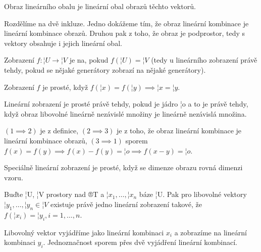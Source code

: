 \documentclass[12pt]{article}					%
\begin{document}
    \begin{tvrzeni}
        Obraz lineárního obalu je lineární obal obrazů těchto vektorů.
        \begin{dukazin}
            Rozdělíme na dvě inkluze. Jedno dokážeme tím, že obraz lineární kombinace je lineární kombinace obrazů. Druhou pak z toho, že obraz je podprostor, tedy s vektory obsahuje i jejich lineární obal.
        \end{dukazin}
    \end{tvrzeni}

    \begin{definice}
        Zobrazení $f: ¦U \rightarrow ¦V$ je na, pokud $f(¦U) = ¦V$ (tedy u lineárního zobrazení právě tehdy, pokud se nějaké generátory zobrazí na nějaké generátory).

        Zobrazení $f$ je prosté, když $f(¦x) = f(¦y) \implies ¦x = ¦y$.
    \end{definice}

    \begin{veta}
        Lineární zobrazení je prosté právě tehdy, pokud je jádro ¦o a to je právě tehdy, když obraz libovolné lineárně nezávislé množiny je lineárně nezávislá množina.

        \begin{dukazin}
            $(1 \implies 2)$ je z definice, $(2 \implies 3)$ je z toho, že obraz lineární kombinace je lineární kombinace obrazů, $(3 \implies 1)$ sporem $f(x) = f(y) \implies f(x) - f(y) = ¦o \implies f(x-y) = ¦o$.
        \end{dukazin}
    \end{veta}

    \begin{dusledek}
        Speciálně lineární zobrazení je prosté, když se dimenze obrazu rovná dimenzi vzoru.
    \end{dusledek}

    \begin{veta}
        Buďte ¦U, ¦V prostory nad ®T a $¦x_1, …, ¦x_n$ báze ¦U. Pak pro libovolné vektory $¦y_1, …, ¦y_n \in ¦V$ existuje právě jedno lineární zobrazení takové, že $f(¦x_i) = ¦y_i, i = 1, …, n$.

        \begin{dukazin}
            Libovolný vektor vyjádříme jako lineární kombinaci $x_i$ a zobrazíme na lineární kombinaci $y_i$. Jednoznačnost sporem přes dvě vyjádření lineární kombinací.    
        \end{dukazin}
    \end{veta}
\end{document}
